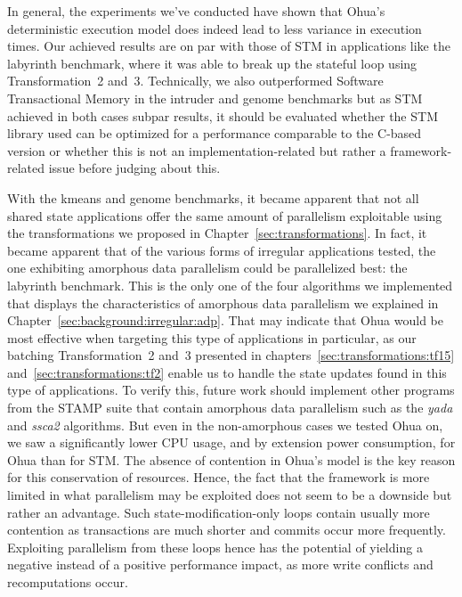 In general, the experiments we've conducted have shown that Ohua's deterministic execution model does indeed lead to less variance in execution times. %
Our achieved results are on par with those of STM in applications like the labyrinth benchmark, where it was able to break up the stateful loop using Transformation~2 and~3.
Technically, we also outperformed Software Transactional Memory in the intruder and genome benchmarks but as STM achieved in both cases subpar results, it should be evaluated whether the STM library used can be optimized for a performance comparable to the C-based version or whether this is not an implementation-related but rather a framework-related issue before judging about this.

With the kmeans and genome benchmarks, it became apparent that not all shared state applications offer the same amount of parallelism exploitable using the transformations we proposed in Chapter~\ref{sec:transformations}.
In fact, it became apparent that of the various forms of irregular applications tested, the one exhibiting amorphous data parallelism could be parallelized best: the labyrinth benchmark.
This is the only one of the four algorithms we implemented that displays the characteristics of amorphous data parallelism we explained in Chapter~\ref{sec:background:irregular:adp}.
That may indicate that Ohua would be most effective when targeting this type of applications in particular, as our batching Transformation~2 and~3 presented in chapters~\ref{sec:transformations:tf15} and~\ref{sec:transformations:tf2} enable us to handle the state updates found in this type of applications.
To verify this, future work should implement other programs from the STAMP suite that contain amorphous data parallelism such as the \emph{yada} and \emph{ssca2} algorithms.
But even in the non-amorphous cases we tested Ohua on, we saw a significantly lower CPU usage, and by extension power consumption, for Ohua than for STM.
The absence of contention in Ohua's model is the key reason for this conservation of resources.
Hence, the fact that the framework is more limited in what parallelism may be exploited does not seem to be a downside but rather an advantage.
Such state-modification-only loops contain usually more contention as transactions are much shorter and commits occur more frequently.
Exploiting parallelism from these loops hence has the potential of yielding a negative instead of a positive performance impact, as more write conflicts and recomputations occur.

